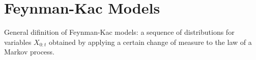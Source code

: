 \section{Feynman-Kac Models}
%
General difinition of Feynman-Kac models: a sequence of distributions for variables $X_{0:t}$ obtained by applying a certain change of measure to the law of a Markov process.
%


